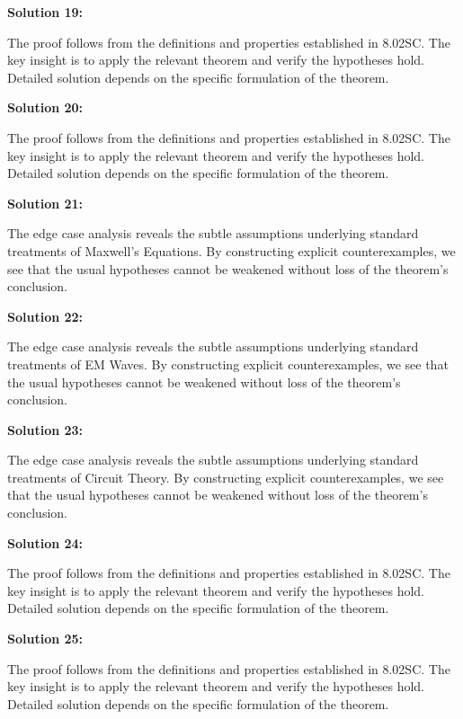 \documentclass[12pt,a4paper]{exam}
\begin{document}
\vspace{0.5cm}

\textbf{Solution 19:}

The proof follows from the definitions and properties established in 8.02SC. The key insight is to apply the relevant theorem and verify the hypotheses hold. Detailed solution depends on the specific formulation of the theorem.

\vspace{0.5cm}

\textbf{Solution 20:}

The proof follows from the definitions and properties established in 8.02SC. The key insight is to apply the relevant theorem and verify the hypotheses hold. Detailed solution depends on the specific formulation of the theorem.

\vspace{0.5cm}

\textbf{Solution 21:}

The edge case analysis reveals the subtle assumptions underlying standard treatments of Maxwell's Equations. By constructing explicit counterexamples, we see that the usual hypotheses cannot be weakened without loss of the theorem's conclusion.

\vspace{0.5cm}

\textbf{Solution 22:}

The edge case analysis reveals the subtle assumptions underlying standard treatments of EM Waves. By constructing explicit counterexamples, we see that the usual hypotheses cannot be weakened without loss of the theorem's conclusion.

\vspace{0.5cm}

\textbf{Solution 23:}

The edge case analysis reveals the subtle assumptions underlying standard treatments of Circuit Theory. By constructing explicit counterexamples, we see that the usual hypotheses cannot be weakened without loss of the theorem's conclusion.

\vspace{0.5cm}

\textbf{Solution 24:}

The proof follows from the definitions and properties established in 8.02SC. The key insight is to apply the relevant theorem and verify the hypotheses hold. Detailed solution depends on the specific formulation of the theorem.

\vspace{0.5cm}

\textbf{Solution 25:}

The proof follows from the definitions and properties established in 8.02SC. The key insight is to apply the relevant theorem and verify the hypotheses hold. Detailed solution depends on the specific formulation of the theorem.

\vspace{0.5cm}
\end{document}
